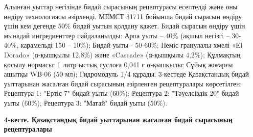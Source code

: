 Алынған уыттар негізінде бидай сырасының рецептурасы есептелді және оны
өндіру технологиясы әзірленді. МЕМСТ 31711 бойынша бидай сырасын өндіру
үшін кем дегенде 50\% бидай уытын қолдану қажет. Бидай сырасын өндіру
үшін мынадай ингредиенттер пайдаланылды: Арпа уыты -- 40\% (ақшыл
негізгі -- 30-40\%, карамельді 150 -- 10\%); Бидай уыты - 50-60\%; Неміс
гранулалы хмелі «El Dorado» (α-қышқылы 12,8\%) және «Cascade» (α-қышқылы
4,2\%); Құлмақтың қосылу нормасы: 1 литр ыстық суслоға 0,041 г
α-қышқылы; Сұйық жоғарғы ашытқы WB-06 (50 мл); Гидромодуль 1/4 құрады.
3-кестеде Қазақстандық бидай уыттарынан жасалған бидай сырасының
әзірленген рецептуралары көрсетілген: Рецептура 1: "Ертіс-7" бидай уыты
(60\%); Рецептура 2: "Тәуелсіздік-20" бидай уыты (60\%); Рецептура 3:
"Матай" бидай уыты (50\%).

{\bfseries 4-кесте. Қазақстандық бидай уыттарынан жасалған бидай сырасының
рецептуралары}

% 
% 
% 
% 
% 
% 
% 
% 
% 

